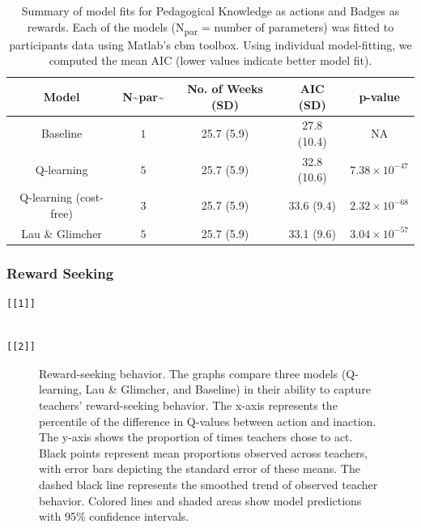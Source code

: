 \documentclass[
  number,
  preprint,
  3p,
  onecolumn]{elsarticle}
\begin{document}
\begin{longtable}{ccccc}

\caption{\label{tbl-model-summary}Summary of model fits for Pedagogical
Knowledge as actions and Badges as rewards. Each of the models
(N\textsubscript{par} = number of parameters) was fitted to participants
data using Matlab's cbm toolbox. Using individual model-fitting, we
computed the mean AIC (lower values indicate better model fit).}

\tabularnewline

\toprule
Model & N\textasciitilde{}par\textasciitilde{} & No. of Weeks (SD) & AIC (SD) & p-value \\ 
\midrule\addlinespace[2.5pt]
Baseline & $1$ & 25.7 (5.9) & 27.8 (10.4) & NA \\ 
Q-learning & $5$ & 25.7 (5.9) & 32.8 (10.6) & $7.38 \times 10^{-47}$ \\ 
Q-learning (cost-free) & $3$ & 25.7 (5.9) & 33.6 (9.4) & $2.32 \times 10^{-68}$ \\ 
Lau \& Glimcher & $5$ & 25.7 (5.9) & 33.1 (9.6) & $3.04 \times 10^{-57}$ \\ 
\bottomrule

\end{longtable}

\subsubsection{Reward Seeking}\label{reward-seeking}

\begin{verbatim}
[[1]]
\end{verbatim}

\begin{verbatim}

[[2]]
\end{verbatim}

\begin{figure}


\caption{\label{fig-reward-seeking-1}Reward-seeking behavior. The graphs
compare three models (Q-learning, Lau \& Glimcher, and Baseline) in
their ability to capture teachers' reward-seeking behavior. The x-axis
represents the percentile of the difference in Q-values between action
and inaction. The y-axis shows the proportion of times teachers chose to
act. Black points represent mean proportions observed across teachers,
with error bars depicting the standard error of these means. The dashed
black line represents the smoothed trend of observed teacher behavior.
Colored lines and shaded areas show model predictions with 95\%
confidence intervals.}

\end{figure}%
\end{document}

